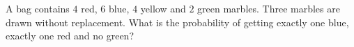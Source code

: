 A bag contains $4$ red, $6$ blue, $4$ yellow and $2$ green marbles. Three marbles are drawn without replacement. What is the probability of getting exactly one blue, exactly one red and no green?
